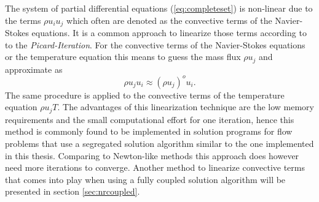 The system of partial differential equations (\ref{eq:completeset}) is non-linear due to the terms \(\rho u_i u_j\) which often are denoted as the convective terms of the Navier-Stokes equations. It is a common approach to linearize those terms according to to the \emph{Picard-Iteration}. For the convective terms of the Navier-Stokes equations or the temperature equation this means to guess the mass flux \( \rho u_j\) and approximate as
\begin{displaymath}
  \rho u_j u_i \approx \left( \rho u_j \right)^o u_i.
\end{displaymath}
The same procedure is applied to the convective terms of the temperature equation \(\rho u_j T\). The advantages of this linearization technique are the low memory requirements and the small computational effort for one iteration, hence this method is commonly found to be implemented in solution programs for flow problems that use a segregated solution algorithm similar to the one implemented in this thesis. Comparing to Newton-like methods this approach does however need more iterations to converge. Another method to linearize convective terms that comes into play when using a fully coupled solution algorithm will be presented in section \ref{sec:nrcoupled}.
